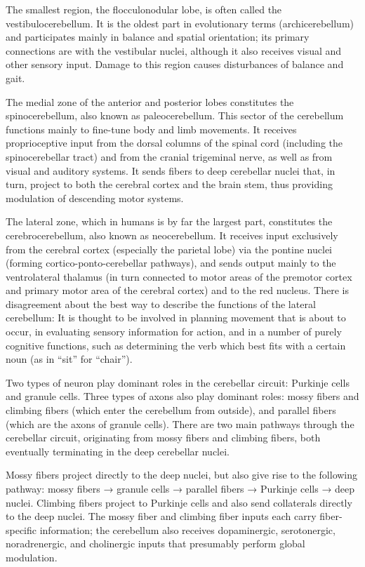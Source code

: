 \documentclass[]{book}
\begin{document}
The smallest region, the flocculonodular lobe, is often called the vestibulocerebellum. It is the oldest part in evolutionary terms (archicerebellum) and participates mainly in balance and spatial orientation; its primary connections are with the vestibular nuclei, although it also receives visual and other sensory input. Damage to this region causes disturbances of balance and gait.

The medial zone of the anterior and posterior lobes constitutes the spinocerebellum, also known as paleocerebellum. This sector of the cerebellum functions mainly to fine-tune body and limb movements. It receives proprioceptive input from the dorsal columns of the spinal cord (including the spinocerebellar tract) and from the cranial trigeminal nerve, as well as from visual and auditory systems. It sends fibers to deep cerebellar nuclei that, in turn, project to both the cerebral cortex and the brain stem, thus providing modulation of descending motor systems.

The lateral zone, which in humans is by far the largest part, constitutes the cerebrocerebellum, also known as neocerebellum. It receives input exclusively from the cerebral cortex (especially the parietal lobe) via the pontine nuclei (forming cortico-ponto-cerebellar pathways), and sends output mainly to the ventrolateral thalamus (in turn connected to motor areas of the premotor cortex and primary motor area of the cerebral cortex) and to the red nucleus. There is disagreement about the best way to describe the functions of the lateral cerebellum: It is thought to be involved in planning movement that is about to occur, in evaluating sensory information for action, and in a number of purely cognitive functions, such as determining the verb which best fits with a certain noun (as in ``sit'' for ``chair'').

Two types of neuron play dominant roles in the cerebellar circuit: Purkinje cells and granule cells. Three types of axons also play dominant roles: mossy fibers and climbing fibers (which enter the cerebellum from outside), and parallel fibers (which are the axons of granule cells). There are two main pathways through the cerebellar circuit, originating from mossy fibers and climbing fibers, both eventually terminating in the deep cerebellar nuclei.

Mossy fibers project directly to the deep nuclei, but also give rise to the following pathway: mossy fibers → granule cells → parallel fibers → Purkinje cells → deep nuclei. Climbing fibers project to Purkinje cells and also send collaterals directly to the deep nuclei. The mossy fiber and climbing fiber inputs each carry fiber-specific information; the cerebellum also receives dopaminergic, serotonergic, noradrenergic, and cholinergic inputs that presumably perform global modulation.
\end{document}

